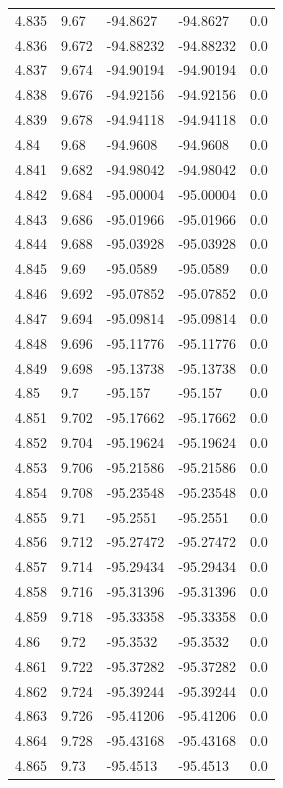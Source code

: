 \begin{tabular}{lllll}
4.835 & 9.67 & -94.8627 & -94.8627 & 0.0 \\
4.836 & 9.672 & -94.88232 & -94.88232 & 0.0 \\
4.837 & 9.674 & -94.90194 & -94.90194 & 0.0 \\
4.838 & 9.676 & -94.92156 & -94.92156 & 0.0 \\
4.839 & 9.678 & -94.94118 & -94.94118 & 0.0 \\
4.84 & 9.68 & -94.9608 & -94.9608 & 0.0 \\
4.841 & 9.682 & -94.98042 & -94.98042 & 0.0 \\
4.842 & 9.684 & -95.00004 & -95.00004 & 0.0 \\
4.843 & 9.686 & -95.01966 & -95.01966 & 0.0 \\
4.844 & 9.688 & -95.03928 & -95.03928 & 0.0 \\
4.845 & 9.69 & -95.0589 & -95.0589 & 0.0 \\
4.846 & 9.692 & -95.07852 & -95.07852 & 0.0 \\
4.847 & 9.694 & -95.09814 & -95.09814 & 0.0 \\
4.848 & 9.696 & -95.11776 & -95.11776 & 0.0 \\
4.849 & 9.698 & -95.13738 & -95.13738 & 0.0 \\
4.85 & 9.7 & -95.157 & -95.157 & 0.0 \\
4.851 & 9.702 & -95.17662 & -95.17662 & 0.0 \\
4.852 & 9.704 & -95.19624 & -95.19624 & 0.0 \\
4.853 & 9.706 & -95.21586 & -95.21586 & 0.0 \\
4.854 & 9.708 & -95.23548 & -95.23548 & 0.0 \\
4.855 & 9.71 & -95.2551 & -95.2551 & 0.0 \\
4.856 & 9.712 & -95.27472 & -95.27472 & 0.0 \\
4.857 & 9.714 & -95.29434 & -95.29434 & 0.0 \\
4.858 & 9.716 & -95.31396 & -95.31396 & 0.0 \\
4.859 & 9.718 & -95.33358 & -95.33358 & 0.0 \\
4.86 & 9.72 & -95.3532 & -95.3532 & 0.0 \\
4.861 & 9.722 & -95.37282 & -95.37282 & 0.0 \\
4.862 & 9.724 & -95.39244 & -95.39244 & 0.0 \\
4.863 & 9.726 & -95.41206 & -95.41206 & 0.0 \\
4.864 & 9.728 & -95.43168 & -95.43168 & 0.0 \\
4.865 & 9.73 & -95.4513 & -95.4513 & 0.0 \\

\end{tabular}
